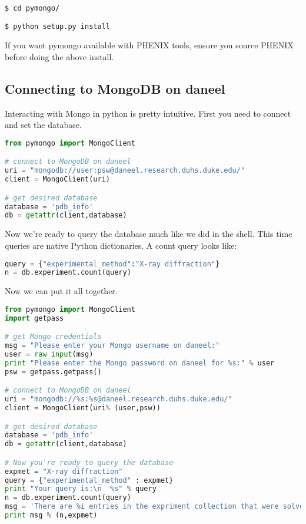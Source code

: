 \documentclass[12pt]{article}
\begin{document}
\noindent
\texttt{\$ cd pymongo/}

\noindent
\texttt{\$ python setup.py install}

\vspace{5mm}
\noindent
If you want pymongo available with PHENIX tools, ensure you source PHENIX before doing the above install.

\newpage
\subsection{Connecting to MongoDB on daneel}
Interacting with Mongo in python is pretty intuitive.
First you need to connect and set the database.

\begin{lstlisting}[language=python]
from pymongo import MongoClient

# connect to MongoDB on daneel
uri = "mongodb://user:psw@daneel.research.duhs.duke.edu/"
client = MongoClient(uri)

# get desired database
database = 'pdb_info'
db = getattr(client,database)
\end{lstlisting}

\noindent
Now we're ready to query the database much like we did in the shell.
This time queries are native Python dictionaries.
A count query looks like:

\begin{lstlisting}[language=python]
query = {"experimental_method":"X-ray diffraction"}
n = db.experiment.count(query)
\end{lstlisting}

\noindent
Now we can put it all together.

\begin{lstlisting}[language=python]
from pymongo import MongoClient
import getpass

# get Mongo credentials
msg = "Please enter your Mongo username on daneel:"
user = raw_input(msg)
print "Please enter the Mongo password on daneel for %s:" % user
psw = getpass.getpass()

# connect to MongoDB on daneel
uri = "mongodb://%s:%s@daneel.research.duhs.duke.edu/"
client = MongoClient(uri% (user,psw))

# get desired database
database = 'pdb_info'
db = getattr(client,database)

# Now you're ready to query the database 
expmet = "X-ray diffraction"
query = {"experimental_method" : expmet}
print "Your query is:\n  %s" % query
n = db.experiment.count(query)
msg = 'There are %i entries in the expriment collection that were solved via %s'
print msg % (n,expmet)
\end{lstlisting}
\end{document}
